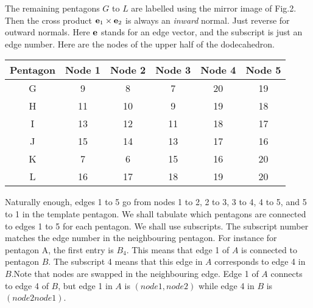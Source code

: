 \documentclass[12pt]{article}
\begin{document}
The remaining pentagons $G$ to $L$ are labelled using the mirror image of Fig.2.
Then the cross product ${\bf e}_1 \times {\bf e}_2$ is always an {\it inward} normal.
Just reverse for outward normals. Here $\bf e$ stands for an edge vector, and
 the subscript is just an edge number. Here are the nodes of the upper half
of the dodecahedron.

\begin{center}
\begin{tabular}{| c | c | c | c | c | c |}
\hline
Pentagon &  Node 1 & Node 2 & Node 3 & Node 4 & Node 5 \\
\hline
G & 9 & 8 & 7 & 20 & 19 \\
H & 11 & 10 & 9 & 19 & 18 \\
I & 13 & 12 & 11 & 18 & 17 \\
J & 15 & 14 & 13 & 17 & 16 \\
K & 7 &  6 & 15 & 16  & 20 \\
L & 16  & 17 & 18 & 19  & 20 \\
\hline
\end{tabular}
\end{center}

Naturally enough, edges 1 to 5 go from nodes 1 to 2, 2 to 3, 3 to 4, 4 to 5, and 5 to 1
in the template pentagon. We shall tabulate which pentagons are connected to 
edges 1 to 5 for each pentagon. We shall use subscripts. The subscript number
matches the edge number in the neighbouring pentagon. For instance
for pentagon A, the first entry is $B_4$. This means that edge 1 of $A$ is connected
 to pentagon $B$. The subscript 4 means that this edge in $A$ corresponds to edge 4 in $B$.Note that nodes are swapped in the neighbouring edge. Edge 1 of $A$ connects to edge 4 of
$B$, but edge 1 in $A$ is $(node 1, node 2)$ while edge 4 in $B$ is $(node 2 node 1)$.
\end{document}
